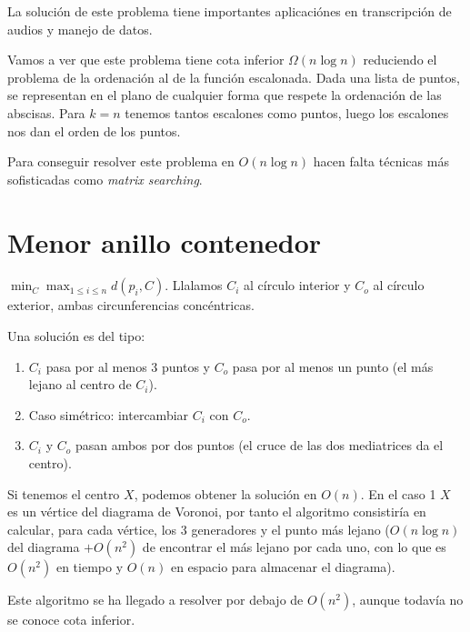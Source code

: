 \documentclass[TGyGC.tex]{subfiles}
\begin{document}
La solución de este problema tiene importantes aplicaciónes en transcripción de audios y manejo de datos. 

Vamos a ver que este problema tiene cota inferior $\Omega(n\log n)$ reduciendo el problema de la ordenación al de la función escalonada. Dada una lista de puntos, se representan en el plano de cualquier forma que respete la ordenación de las abscisas. Para $k=n$ tenemos tantos escalones como puntos, luego los escalones nos dan el orden de los puntos. 

Para conseguir resolver este problema en $O(n\log n)$ hacen falta técnicas más sofisticadas como \emph{matrix searching}. 

\section{Menor anillo contenedor}
$\min_C\max_{1\leq i\leq n} d(p_i,C)$. Llalamos $C_i$ al círculo interior y $C_o$ al círculo exterior, ambas circunferencias concéntricas.

\begin{lemma}
Una solución es del tipo:
\begin{enumerate}
\item $C_i$ pasa por al menos 3 puntos y $C_o$ pasa por al menos un punto (el más lejano al centro de $C_i$).
\item Caso simétrico: intercambiar $C_i$ con $C_o$. 
\item $C_i$ y $C_o$ pasan ambos por dos puntos (el cruce de las dos mediatrices da el centro). 
\end{enumerate}
\end{lemma}


\begin{observacion}
Si tenemos el centro $X$, podemos obtener la solución en $O(n)$. En el caso 1 $X$ es un vértice del diagrama de Voronoi, por tanto el algoritmo consistiría en calcular, para cada vértice, los 3 generadores y el punto más lejano ($O(n\log n)$ del diagrama $+O(n^2)$ de encontrar el más lejano por cada uno, con lo que es $O(n^2)$ en tiempo y $O(n)$ en espacio para almacenar el diagrama). 
\end{observacion}

Este algoritmo se ha llegado a resolver por debajo de $O(n^2)$, aunque todavía no se conoce cota inferior. 
\end{document}
